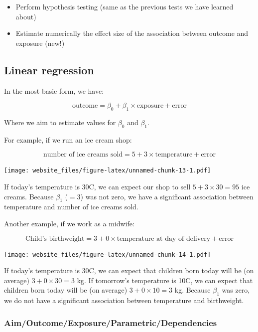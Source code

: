 \documentclass[12pt,]{article}
\providecommand{\tightlist}{%
  \setlength{\itemsep}{0pt}\setlength{\parskip}{0pt}}
\begin{document}
\begin{itemize}
\tightlist
\item
  Perform hypothesis testing (same as the previous tests we have learned
  about)
\item
  Estimate numerically the effect size of the association between
  outcome and exposure (new!)
\end{itemize}

\subsection{Linear regression}\label{linear-regression}

In the most basic form, we have:

\[\text{outcome} = \beta_0 + \beta_1 \times \text{exposure} + \text{error}\]

Where we aim to estimate values for \(\beta_0\) and \(\beta_1\).

For example, if we run an ice cream shop:

\[\text{number of ice creams sold} = 5 + 3 \times \text{temperature} + \text{error}\]

\texttt{[image: website\_files/figure-latex/unnamed-chunk-13-1.pdf]}

If today's temperature is 30C, we can expect our shop to sell
\(5 + 3 \times 30 = 95\) ice creams. Because \(\beta_1\) (\(=3\)) was
not zero, we have a significant association between temperature and
number of ice creams sold.

Another example, if we work as a midwife:

\[\text{Child's birthweight} = 3 + 0 \times \text{temperature at day of delivery} + \text{error}\]

\texttt{[image: website\_files/figure-latex/unnamed-chunk-14-1.pdf]}

If today's temperature is 30C, we can expect that children born today
will be (on average) \(3 + 0 \times 30 = 3\) kg. If tomorrow's
temperature is 10C, we can expect that children born today will be (on
average) \(3 + 0 \times 10 = 3\) kg. Because \(\beta_1\) was zero, we do
not have a significant association between temperature and birthweight.

\subsubsection{Aim/Outcome/Exposure/Parametric/Dependencies}\label{aimoutcomeexposureparametricdependencies-5}
\end{document}
